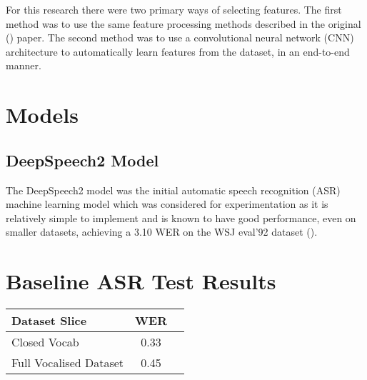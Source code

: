 For this research there were two primary ways of selecting features. The first method
was to use the same feature processing methods described in the original
(\cite{gaddy2020digital}) paper. The second method was to use a convolutional
neural network (CNN) architecture to automatically learn features from the
dataset, in an end-to-end manner.

\section{Models}

\subsection{DeepSpeech2 Model}

The DeepSpeech2 model was the initial automatic speech recognition (ASR) machine
learning model which was considered for experimentation as it is relatively simple to
implement and is known to have good performance, even on smaller datasets, achieving
a 3.10 WER on the WSJ eval'92 dataset
(\cite{DS2_original}).

\section{Baseline ASR Test Results}

\begin{center}
\begin{tabular} { | l c | c | }
Dataset Slice & WER \\
\hline
Closed Vocab & 0.33 \\
Full Vocalised Dataset & 0.45
\end{tabular}
\end{center}